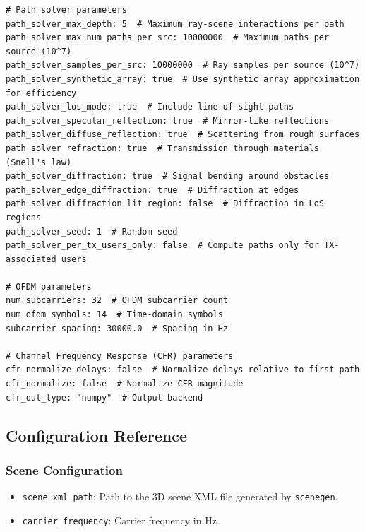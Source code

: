 \documentclass{article}
\begin{document}
\begin{verbatim}
# Path solver parameters
path_solver_max_depth: 5  # Maximum ray-scene interactions per path
path_solver_max_num_paths_per_src: 10000000  # Maximum paths per source (10^7)
path_solver_samples_per_src: 10000000  # Ray samples per source (10^7)
path_solver_synthetic_array: true  # Use synthetic array approximation for efficiency
path_solver_los_mode: true  # Include line-of-sight paths
path_solver_specular_reflection: true  # Mirror-like reflections
path_solver_diffuse_reflection: true  # Scattering from rough surfaces
path_solver_refraction: true  # Transmission through materials (Snell's law)
path_solver_diffraction: true  # Signal bending around obstacles
path_solver_edge_diffraction: true  # Diffraction at edges
path_solver_diffraction_lit_region: false  # Diffraction in LoS regions
path_solver_seed: 1  # Random seed
path_solver_per_tx_users_only: false  # Compute paths only for TX-associated users

# OFDM parameters
num_subcarriers: 32  # OFDM subcarrier count
num_ofdm_symbols: 14  # Time-domain symbols
subcarrier_spacing: 30000.0  # Spacing in Hz

# Channel Frequency Response (CFR) parameters
cfr_normalize_delays: false  # Normalize delays relative to first path
cfr_normalize: false  # Normalize CFR magnitude
cfr_out_type: "numpy"  # Output backend
\end{verbatim}

\subsection{Configuration Reference}

\subsubsection{Scene Configuration}
\begin{itemize}
  \item \texttt{scene\_xml\_path}: Path to the 3D scene XML file generated by \texttt{scenegen}.
  \item \texttt{carrier\_frequency}: Carrier frequency in Hz.
\end{itemize}
\end{document}
